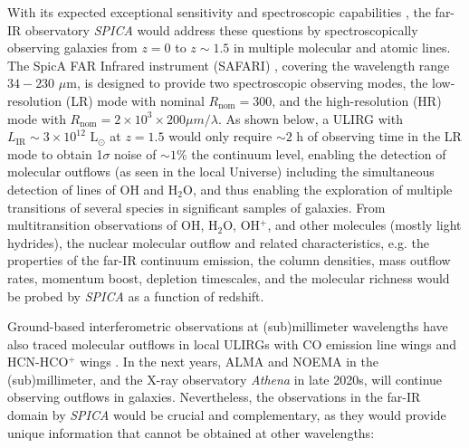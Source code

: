 \documentclass{pasa}%
\begin{document}
With its expected exceptional sensitivity and spectroscopic capabilities 
\citep{swi09,nak14,sib16,roe17,spi17}, the far-IR observatory {\it SPICA} 
would address these questions by spectroscopically observing galaxies from
$z=0$ to $z\sim1.5$ in multiple molecular and atomic lines. 
The SpicA FAR Infrared instrument (SAFARI) \citep{swi09,pas16,spi17},
covering the wavelength range $34-230$ $\mu$m, is designed to provide two
spectroscopic observing modes, the low-resolution (LR) mode with nominal 
$R_{\mathrm{nom}}=300$, and the high-resolution (HR) mode with 
$R_{\mathrm{nom}}=2\times10^3\times200\mu m/\lambda$.
As shown below, a ULIRG with $L_{\mathrm{IR}}\sim3\times10^{12}$
L$_{\mathrm{\odot}}$ at $z=1.5$ would only require 
$\sim2$ h of observing time in the LR mode to 
obtain 1$\sigma$ noise of $\sim1$\% the continuum level, enabling the
detection of molecular outflows (as seen in the local Universe)
including the simultaneous detection of lines of OH and H$_2$O, and thus
enabling the exploration of multiple transitions of several species in
significant samples of galaxies.  
From multitransition observations of OH, H$_2$O, OH$^+$, and other molecules
(mostly light hydrides), the nuclear molecular outflow and related
characteristics, e.g. the properties of the far-IR continuum emission, 
the column densities, mass outflow rates, momentum boost, depletion
timescales, and the molecular richness would be probed by {\it SPICA} as a
function of redshift.   

Ground-based interferometric observations at (sub)millimeter wavelengths have
also traced molecular outflows in local ULIRGs with CO emission line wings
\citep[e.g.][]{fer10,cic12,cic14,gar15} and HCN-HCO$^+$ wings
\citep[e.g.][]{sak09,aal12,aal15,lin16,pri17}. In 
the next years, ALMA and NOEMA in the (sub)millimeter, and the X-ray
observatory {\it Athena} in late 2020s, will continue observing
outflows in galaxies. Nevertheless, the observations in the far-IR domain by
{\it SPICA} would be crucial and complementary, as they would provide unique
information that cannot be obtained at other wavelengths: 
\end{document}

